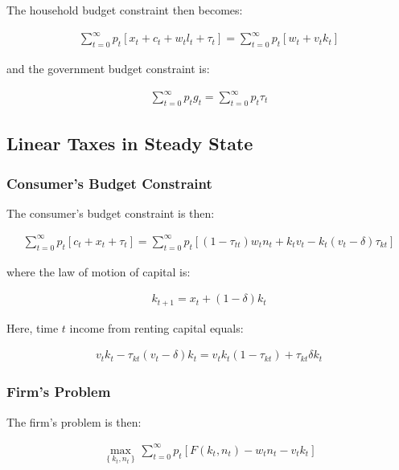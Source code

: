 \documentclass[10pt]{article}
\begin{document}
The household budget constraint then becomes:

\begin{align}
    \sum_{t=0}^{\infty} p_t\left[x_t+c_t+w_t l_t+\tau_t\right]=\sum_{t=0}^{\infty} p_t\left[w_t+v_t k_t\right]
\end{align}

and the government budget constraint is:

\begin{align}
    \sum_{t=0}^{\infty} p_t g_t=\sum_{t=0}^{\infty} p_t \tau_t
\end{align}


\subsection{Linear Taxes in Steady State}


\subsubsection{Consumer's Budget Constraint}

The consumer's budget constraint is then:

\begin{align}
    \sum_{t=0}^{\infty} p_t\left[c_t+x_t+\tau_t\right]=\sum_{t=0}^{\infty} p_t\left[\left(1-\tau_{t t}\right) w_t n_t+k_t v_t-k_t\left(v_t-\delta\right) \tau_{k t}\right]
\end{align}

where the law of motion of capital is:

\begin{align}
    k_{t+1}=x_t+(1-\delta) k_t
\end{align}

Here, time $t$ income from renting capital equals:

\begin{align}
    v_t k_t-\tau_{k t}\left(v_t-\delta\right) k_t=v_t k_t\left(1-\tau_{k t}\right)+\tau_{k t} \delta k_t
\end{align}

\subsubsection{Firm's Problem}

The firm's problem is then:

\begin{align}
    \max _{\left\{k_t, n_t\right\}} \sum_{t=0}^{\infty} p_t\left[F\left(k_t, n_t\right)-w_t n_t-v_t k_t\right]
\end{align}
\end{document}
